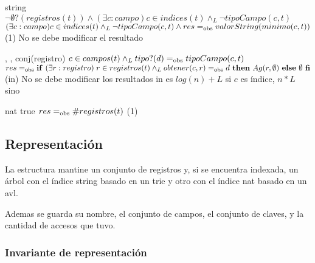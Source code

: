 {   }
{string}
{$\neg\emptyset?(registros(t)) \land
    (\exists c : campo) c \in indices(t) \land_L \neg tipoCampo(c,t)$}
{$(\exists c : campo) c \in indices(t) \land_L \neg tipoCampo(c,t) \land
    res =_{\mathrm{obs}} valorString(minimo(c,t))$}
{\bigo(1)}
{No se debe modificar el resultado}
{}

{   ,
    ,
    }
{conj(registro)}
{$c \in campos(t) \land_L tipo?(d) =_{\mathrm{obs}} tipoCampo(c,t)$}
{$res \igobs \IFLM (\exists r : registro) \; r \in registros(t) \land_L obtener(c,r) \igobs d
    THEN Ag(r,\emptyset) ELSE \emptyset FI$}
{\bigo(in)}
{No se debe modificar los resultados}
{in es $log(n) + L$ si $c$ es índice, $n * L$ sino}

{   }
{nat}
{true}
{$res =_{\mathrm{obs}} \#registros(t)$}
{\bigo(1)}
{}
{}

\subsection{Representación}

La estructura mantine un conjunto de registros y, si se encuentra indexada, un árbol con el índice string basado en un trie y otro con el índice nat basado en un avl.

Ademas se guarda su nombre, el conjunto de campos, el conjunto de claves, y la cantidad de accesos que tuvo.

\vspace*{2em}




\subsubsection{Invariante de representación}

